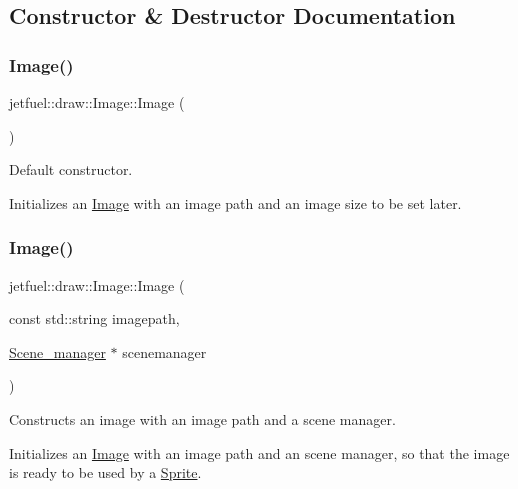\subsection{Constructor \& Destructor Documentation}
\mbox{\label{classjetfuel_1_1draw_1_1Image_a63078fc295eb37ef549e17187d839574}} 
\subsubsection{\texorpdfstring{Image()}{Image()}\hspace{0.1cm}{\footnotesize\ttfamily [1/3]}}
{\footnotesize\ttfamily jetfuel\+::draw\+::\+Image\+::\+Image (\begin{DoxyParamCaption}{ }\end{DoxyParamCaption})\hspace{0.3cm}{\ttfamily [inline]}}



Default constructor. 

Initializes an \hyperlink{classjetfuel_1_1draw_1_1Image}{Image} with an image path and an image size to be set later. \mbox{\label{classjetfuel_1_1draw_1_1Image_a36c7a9de74ed515a90b5688d7efb040c}} 
\subsubsection{\texorpdfstring{Image()}{Image()}\hspace{0.1cm}{\footnotesize\ttfamily [2/3]}}
{\footnotesize\ttfamily jetfuel\+::draw\+::\+Image\+::\+Image (\begin{DoxyParamCaption}\item[{const std\+::string}]{imagepath,  }\item[{\hyperlink{classjetfuel_1_1draw_1_1Scene__manager}{Scene\+\_\+manager} $\ast$}]{scenemanager }\end{DoxyParamCaption})}



Constructs an image with an image path and a scene manager. 

Initializes an \hyperlink{classjetfuel_1_1draw_1_1Image}{Image} with an image path and an scene manager, so that the image is ready to be used by a \hyperlink{classjetfuel_1_1draw_1_1Sprite}{Sprite}.


